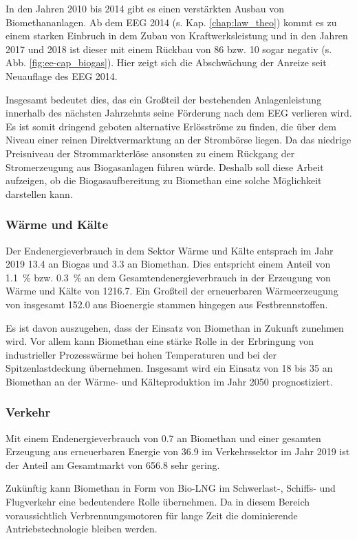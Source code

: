

In den Jahren 2010 bis 2014 gibt es einen verstärkten Ausbau von Biomethananlagen. Ab dem \gls{EEG} 2014 (s. Kap. \ref{chap:law_theo}) kommt es zu einem starken Einbruch in dem Zubau von Kraftwerksleistung und in den Jahren 2017 und 2018 ist dieser mit einem Rückbau von \SI{86}{\mw} bzw. \SI{10}{\mw} sogar negativ (s. Abb. \ref{fig:ee-cap_biogas}). Hier zeigt sich die Abschwächung der Anreize seit Neuauflage des \gls{EEG} 2014. \parencite{BWE2020} \smallskip

Insgesamt bedeutet dies, das ein Großteil der bestehenden Anlagenleistung innerhalb des nächsten Jahrzehnts seine Förderung nach dem \gls{EEG} verlieren wird. Es ist somit dringend geboten alternative Erlösströme zu finden, die über dem Niveau einer reinen Direktvermarktung an der Strombörse liegen. Da das niedrige Preisniveau der Strommarkterlöse ansonsten zu einem Rückgang der Stromerzeugung aus Biogasanlagen führen würde. Deshalb soll diese Arbeit aufzeigen, ob die Biogasaufbereitung zu Biomethan eine solche Möglichkeit darstellen kann.


\subsubsection{Wärme und Kälte}

Der Endenergieverbrauch in dem Sektor Wärme und Kälte entsprach im Jahr 2019 \SI{13.4}{\twh} an Biogas und \SI{3.3}{\twh} an Biomethan. Dies entspricht einem Anteil von \SI{1.1}{\percent} bzw. \SI{0.3}{\percent} an dem Gesamtendenergieverbrauch in der Erzeugung von Wärme und Kälte von \SI{1216.7}{\twh}. Ein Großteil der erneuerbaren Wärmeerzeugung von insgesamt \SI{152.0}{\twh} aus Bioenergie stammen hingegen aus Festbrennstoffen. \parencite{BWE2020}\smallskip

Es ist davon auszugehen, dass der Einsatz von Biomethan in Zukunft zunehmen wird. Vor allem kann Biomethan eine stärke Rolle in der Erbringung von industrieller Prozesswärme bei hohen Temperaturen und bei der Spitzenlastdeckung übernehmen. Insgesamt wird ein Einsatz von \SI{18}{\twh} bis \SI{35}{\twh} an Biomethan an der Wärme- und Kälteproduktion im Jahr 2050 prognostiziert. \parencite{dena2017}

\subsubsection{Verkehr}

Mit einem Endenergieverbrauch von \SI{0.7}{\twh} an Biomethan und einer gesamten Erzeugung aus erneuerbaren Energie von \SI{36.9}{\twh} im Verkehrssektor im Jahr 2019 ist der Anteil am Gesamtmarkt von \SI{656.8}{\twh} sehr gering. \parencite{BWE2020} \smallskip

Zukünftig kann Biomethan in Form von Bio-\gls{LNG} im \mbox{Schwerlast-,} Schiffs- und Flugverkehr eine bedeutendere Rolle übernehmen. Da in diesem Bereich voraussichtlich Verbrennungsmotoren für lange Zeit die dominierende Antriebstechnologie bleiben werden. \parencite{dena2017}